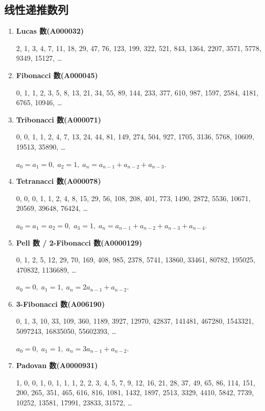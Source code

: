 \subsection{线性递推数列}

\begin{enumerate}
    \item \textbf{Lucas 数(A000032)}

          2, 1, 3, 4, 7, 11, 18, 29, 47, 76, 123, 199, 322, 521, 843, 1364, 2207, 3571, 5778, 9349, 15127, \dots

    \item \textbf{Fibonacci 数(A000045)}

          0, 1, 1, 2, 3, 5, 8, 13, 21, 34, 55, 89, 144, 233, 377, 610, 987, 1597, 2584, 4181, 6765, 10946, \dots

    \item \textbf{Tribonacci 数(A000071)}

          0, 0, 1, 1, 2, 4, 7, 13, 24, 44, 81, 149, 274, 504, 927, 1705, 3136, 5768, 10609, 19513, 35890, \dots

          \( a_0 = a_1 = 0,\; a_2 = 1,\; a_n = a_{n - 1} + a_{n - 2} + a_{n - 3} \).

    \item \textbf{Tetranacci 数(A000078)}

          0, 0, 0, 1, 1, 2, 4, 8, 15, 29, 56, 108, 208, 401, 773, 1490, 2872, 5536, 10671, 20569, 39648, 76424, \dots

          \( a_0 = a_1 = a_2 = 0,\; a_3 = 1,\; a_n = a_{n - 1} + a_{n - 2} + a_{n - 3} + a_{n - 4} \).

    \item \textbf{Pell 数 / 2-Fibonacci 数(A0000129)}

          0, 1, 2, 5, 12, 29, 70, 169, 408, 985, 2378, 5741, 13860, 33461, 80782, 195025, 470832, 1136689, \dots

          \( a_0 = 0,\; a_1 = 1,\; a_n = 2a_{n - 1} + a_{n - 2} \).

    \item \textbf{3-Fibonacci 数(A006190)}

          0, 1, 3, 10, 33, 109, 360, 1189, 3927, 12970, 42837, 141481, 467280, 1543321, 5097243, 16835050, 55602393, \dots

          \( a_0 = 0,\; a_1 = 1,\; a_n = 3a_{n - 1} + a_{n - 2} \).

    \item \textbf{Padovan 数(A0000931)}

          1, 0, 0, 1, 0, 1, 1, 1, 2, 2, 3, 4, 5, 7, 9, 12, 16, 21, 28, 37, 49, 65, 86, 114, 151, 200, 265, 351, 465, 616, 816, 1081, 1432, 1897, 2513, 3329, 4410, 5842, 7739, 10252, 13581, 17991, 23833, 31572, \dots


\end{enumerate}
